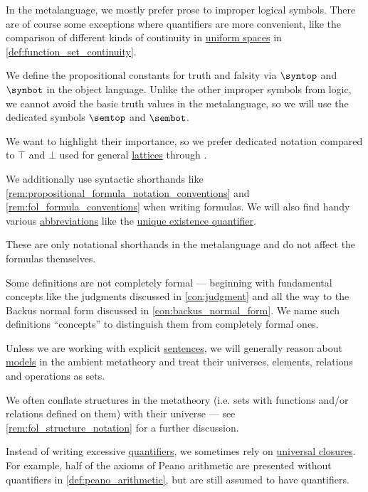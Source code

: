 \begin{remark}
\begin{thmenum}
    In the metalanguage, we mostly prefer prose to improper logical symbols. There are of course some exceptions where quantifiers are more convenient, like the comparison of different kinds of continuity in \hyperref[def:uniform_space]{uniform spaces} in \cref{def:function_set_continuity}.

     We define the propositional constants for truth and falsity via \( \syntop \) and \( \synbot \) in the object language. Unlike the other improper symbols from logic, we cannot avoid the basic truth values in the metalanguage, so we will use the dedicated symbols \( \semtop \) and \( \sembot \).

    We want to highlight their importance, so we prefer dedicated notation compared to \( \top \) and \( \bot \) used for general \hyperref[def:lattice]{lattices} through .

     We additionally use syntactic shorthands like \cref{rem:propositional_formula_notation_conventions} and \cref{rem:fol_formula_conventions} when writing formulas. We will also find handy various \hyperref[con:syntactic_abbreviation]{abbreviations} like the \hyperref[con:description_operator/unique_existence]{unique existence quantifier}.

    These are only notational shorthands in the metalanguage and do not affect the formulas themselves.

     Some definitions are not completely formal --- beginning with fundamental concepts like the judgments discussed in \cref{con:judgment} and all the way to the Backus normal form discussed in \cref{con:backus_normal_form}. We name such definitions \enquote{concepts} to distinguish them from completely formal ones.

     Unless we are working with explicit \hyperref[con:proposition]{sentences}, we will generally reason about \hyperref[con:logical_model]{models} in the ambient metatheory and treat their universes, elements, relations and operations as sets.

     We often conflate structures in the metatheory (i.e. sets with functions and/or relations defined on them) with their universe --- see \cref{rem:fol_structure_notation} for a further discussion.

     Instead of writing excessive \hyperref[con:predicate_logic/quantifiers]{quantifiers}, we sometimes rely on \hyperref[def:fol_quantifier_closure]{universal closures}. For example, half of the axioms of Peano arithmetic are presented without quantifiers in \cref{def:peano_arithmetic}, but are still assumed to have quantifiers.
  \end{thmenum}
\end{remark}
